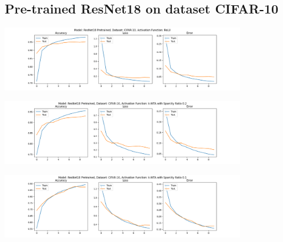 \documentclass[a4paper]{article}
\begin{document}
		\subsection{Pre-trained ResNet18 on dataset CIFAR-10}
			\begin{center}
				\centering
				\includegraphics[width=400px,keepaspectratio]{Results/ResNet18_CIFAR-10_ReLU_Pretrained.png}
			\end{center}
			\begin{center}
				\centering
				\includegraphics[width=400px,keepaspectratio]{Results/ResNet18_CIFAR-10_k-WTA_0.2_Pretrained.png}
			\end{center}
			\begin{center}
				\centering
				\includegraphics[width=400px,keepaspectratio]{Results/ResNet18_CIFAR-10_k-WTA_0.1_Pretrained.png}
			\end{center}
		
		 
		
\end{document}
